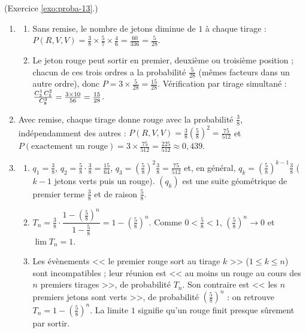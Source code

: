 \begin{corrige}
%
\begin{sol} (Exercice \ref{exo:proba-13}.)
\begin{enumerate}
\item \begin{enumerate}
      \item Sans remise, le nombre de jetons diminue de $1$ \`a chaque tirage :
            $P(R,V,V) = \frac{3}{8}\times\frac{5}{7}\times\frac{4}{6} = \frac{60}{336} = \frac{5}{28}$.
      \item Le jeton rouge peut sortir en premier, deuxi\`eme ou troisi\`eme position ; chacun de ces trois ordres a la probabilit\'e $\frac{5}{28}$
            (m\^emes facteurs dans un autre ordre), donc $P = 3\times\frac{5}{28} = \frac{15}{28}$.
            V\'erification par tirage simultan\'e : $\frac{C_{3}^{1}\,C_{5}^{2}}{C_{8}^{3}} = \frac{3\times 10}{56} = \frac{15}{28}$.
      \end{enumerate}
\item Avec remise, chaque tirage donne rouge avec la probabilit\'e $\frac{3}{8}$, ind\'ependamment des autres :
      $P(R,V,V) = \frac{3}{8}\left(\frac{5}{8}\right)^2 = \frac{75}{512}$ et
      $P(\text{exactement un rouge}) = 3\times\frac{75}{512} = \frac{225}{512}\approx 0,439$.
\item \begin{enumerate}
      \item $q_1 = \frac{3}{8}$, $q_2 = \frac{5}{8}\cdot\frac{3}{8} = \frac{15}{64}$, $q_3 = \left(\frac{5}{8}\right)^2\frac{3}{8} = \frac{75}{512}$ et, en g\'en\'eral,
            $q_k = \left(\frac{5}{8}\right)^{k-1}\frac{3}{8}$ ($k-1$ jetons verts puis un rouge).
            $(q_k)$ est une suite g\'eom\'etrique de premier terme $\frac{3}{8}$ et de raison $\frac{5}{8}$.
      \item $T_n = \frac{3}{8}\cdot\dfrac{1 - \left(\frac{5}{8}\right)^n}{1 - \frac{5}{8}} = 1 - \left(\frac{5}{8}\right)^n$.
            Comme $0 < \frac{5}{8} < 1$, $\left(\frac{5}{8}\right)^n \to 0$ et $\lim T_n = 1$.
      \item Les \'ev\`enements << le premier rouge sort au tirage $k$ >> ($1\le k\le n$) sont incompatibles ;
            leur r\'eunion est << au moins un rouge au cours des $n$ premiers tirages >>, de probabilit\'e $T_n$.
            Son contraire est << les $n$ premiers jetons sont verts >>, de probabilit\'e $\left(\frac{5}{8}\right)^n$ : on retrouve
            $T_n = 1 - \left(\frac{5}{8}\right)^n$. La limite $1$ signifie qu'un rouge finit presque s\^urement par sortir.
      \end{enumerate}

\end{enumerate}
\end{sol}
\end{corrige}
